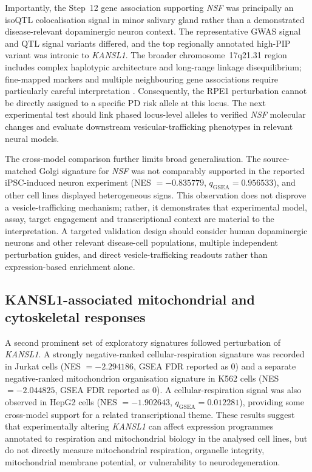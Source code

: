 \documentclass[11pt,a4paper]{article}
\begin{document}
Importantly, the Step~12 gene association supporting \textit{NSF} was principally an isoQTL colocalisation signal in minor salivary gland rather than a demonstrated disease-relevant dopaminergic neuron context. The representative GWAS signal and QTL signal variants differed, and the top regionally annotated high-PIP variant was intronic to \textit{KANSL1}. The broader chromosome~17q21.31 region includes complex haplotypic architecture and long-range linkage disequilibrium; fine-mapped markers and multiple neighbouring gene associations require particularly careful interpretation \cite{Bowles2022MAPTInversion}. Consequently, the RPE1 perturbation cannot be directly assigned to a specific PD risk allele at this locus. The next experimental test should link phased locus-level alleles to verified \textit{NSF} molecular changes and evaluate downstream vesicular-trafficking phenotypes in relevant neural models.

The cross-model comparison further limits broad generalisation. The source-matched Golgi signature for \textit{NSF} was not comparably supported in the reported iPSC-induced neuron experiment (NES $=-0.835779$, $q_{\mathrm{GSEA}}=0.956533$), and other cell lines displayed heterogeneous signs. This observation does not disprove a vesicle-trafficking mechanism; rather, it demonstrates that experimental model, assay, target engagement and transcriptional context are material to the interpretation. A targeted validation design should consider human dopaminergic neurons and other relevant disease-cell populations, multiple independent perturbation guides, and direct vesicle-trafficking readouts rather than expression-based enrichment alone.

\subsection{KANSL1-associated mitochondrial and cytoskeletal responses}
\label{subsec:discussion_kansl1}
A second prominent set of exploratory signatures followed perturbation of \textit{KANSL1}. A strongly negative-ranked cellular-respiration signature was recorded in Jurkat cells (NES $=-2.294186$, GSEA FDR reported as 0) and a separate negative-ranked mitochondrion organisation signature in K562 cells (NES $=-2.044825$, GSEA FDR reported as 0). A cellular-respiration signal was also observed in HepG2 cells (NES $=-1.902643$, $q_{\mathrm{GSEA}}=0.012281$), providing some cross-model support for a related transcriptional theme. These results suggest that experimentally altering \textit{KANSL1} can affect expression programmes annotated to respiration and mitochondrial biology in the analysed cell lines, but do not directly measure mitochondrial respiration, organelle integrity, mitochondrial membrane potential, or vulnerability to neurodegeneration.
\end{document}
